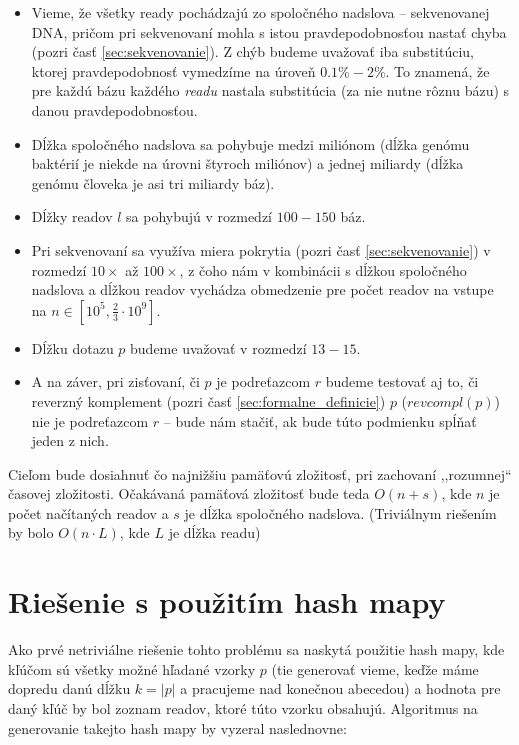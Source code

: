 \begin{itemize}
    \item Vieme, že všetky ready pochádzajú zo
    spoločného nadslova -- sekvenovanej DNA, pričom pri sekvenovaní mohla s
    istou pravdepodobnosťou nastať chyba (pozri časť \ref{sec:sekvenovanie}). Z chýb budeme uvažovať iba substitúciu, ktorej pravdepodobnosť vymedzíme na úroveň $0.1\% - 2\% $. To znamená, že pre každú bázu každého \emph{readu} nastala substitúcia (za nie nutne rôznu bázu) s danou pravdepodobnosťou.
    \item Dĺžka spoločného nadslova sa pohybuje medzi miliónom (dĺžka
    genómu baktérií je niekde na úrovni štyroch miliónov) a jednej
    miliardy (dĺžka genómu človeka je asi tri miliardy báz).
    \item Dĺžky readov $l$ sa pohybujú v rozmedzí $100 - 150$ báz.
    \item Pri sekvenovaní sa využíva miera pokrytia (pozri časť \ref{sec:sekvenovanie}) v rozmedzí $10\times$ až $100\times$, z čoho nám v kombinácii s dĺžkou spoločného nadslova a dĺžkou readov vychádza obmedzenie pre počet readov na vstupe na 
    $n \in [ 10^5, \frac{2}{3} \cdot 10^9 ]$.
    \item Dĺžku dotazu $p$ budeme uvažovať v rozmedzí $13 -15$. 
    \item A na záver, pri zisťovaní, či $p$ je podreťazcom $r$ budeme testovať
    aj to, či reverzný komplement (pozri časť \ref{sec:formalne_definicie}) $p$ ($revcompl(p)$) nie je podreťazcom $r$ -- bude nám stačiť, ak bude túto podmienku spĺňať jeden z nich. 
\end{itemize}

Cieľom bude dosiahnuť čo najnižšiu pamäťovú zložitosť, pri zachovaní
,,rozumnej`` časovej zložitosti. Očakávaná pamäťová zložitosť bude teda $O(n +
s)$, kde $n$ je počet načítaných readov a $s$ je dĺžka spoločného
nadslova. (Triviálnym riešením by bolo $O(n \cdot L)$, kde $L$ je dĺžka readu)

\section{Riešenie s použitím hash mapy}
\label{sec:riesenie_s_pouzitim_hash_mapy}
Ako prvé netriviálne riešenie tohto problému sa naskytá použitie hash mapy,
kde kľúčom sú všetky možné hľadané vzorky $p$ (tie generovať vieme,
keďže máme dopredu danú dĺžku $k = |p|$ a pracujeme nad konečnou abecedou) a
hodnota pre daný kľúč by bol zoznam readov, ktoré túto vzorku
obsahujú. Algoritmus na generovanie takejto hash mapy by vyzeral naslednovne:

